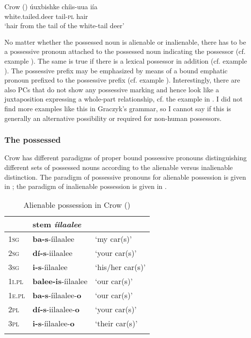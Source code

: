 \documentclass[output=paper]{LSP/langsci}
\begin{document}
\ea Crow (\citealt[236]{Graczyk2007}) \label{crowdeer}
\ex 
\gll úuxbishke            chíis-uua iía \\
white.tailed.deer tail-\textsc{pl}      hair \\
\glt `hair from the tail of the white-tail deer'
\z \z

No matter whether the possessed noun is alienable or inalienable, there has to be a possessive pronoun attached to the possessed noun indicating the possessor (cf. example ). The same is true if there is a lexical possessor in addition (cf. example ). The possessive prefix may be emphasized by means of a bound emphatic pronoun prefixed to the possessive prefix (cf. example ). Interestingly, there are also PCs that do not show any possessive marking and hence look like a juxtaposition expressing a whole-part relationship, cf. the example in . I did not find more examples like this in Graczyk's grammar, so I cannot say if this is generally an alternative possibility or required for non-human possessors.

\subsubsection{The possessed}
Crow has different paradigms of proper bound possessive pronouns distinguishing different sets of possessed nouns according to the alienable versus inalienable distinction. The paradigm of possessive pronouns for alienable possession is given in ; the paradigm of inalienable possession is given in .

\begin{table}
\caption{Alienable possession in Crow (\citealt[53]{Graczyk2007})} \label{crowalienablepossession}
\begin{tabular}{ l l l}
\lsptoprule
& stem \textit{íilaalee} & \\
\midrule 	
\textsc{1sg} & \textbf{ba-s}-íilaalee	& `my car(s)' \\
 
\textsc{2sg} & \textbf{dí-s}-iilaalee & `your car(s)' \\
 
\textsc{3sg} & \textbf{i-s}-íilaalee & `his/her car(s)' \\
 
\textsc{1i.pl} & \textbf{balee-is}-íilaalee & `our car(s)' \\
 
\textsc{1e.pl} & \textbf{ba-s}-íilaalee-\textbf{o} & `our car(s)' \\
 
\textsc{2pl} & \textbf{dí-s}-iilaalee-\textbf{o} & `your car(s)' \\
 
\textsc{3pl} & \textbf{i-s}-íilaalee-\textbf{o} & `their car(s)' \\
\lspbottomrule
\end{tabular}
\end{table}
\end{document}
